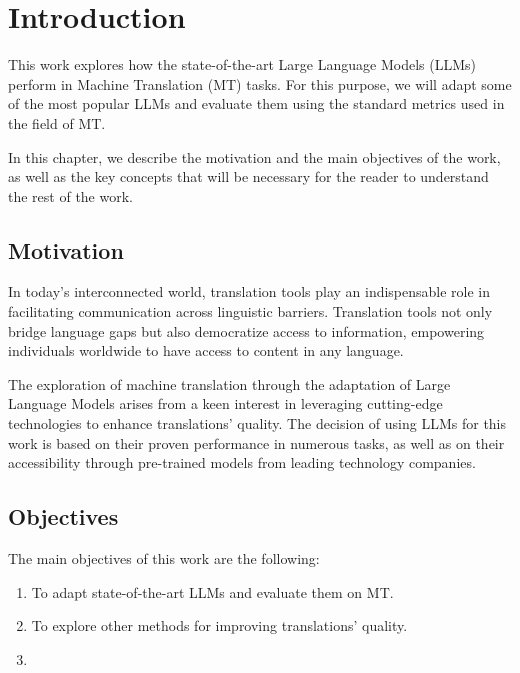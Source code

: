 \documentclass[11pt,english,listoffigures,listoftables]{tfgetsinf}
\begin{document}

\chapter{Introduction}

This work explores how the state-of-the-art Large Language Models (LLMs) perform in Machine Translation (MT) tasks. For this purpose, we will adapt some of the most popular LLMs and evaluate them using the standard metrics used in the field of MT. 

In this chapter, we describe the motivation and the main objectives of the work, as well as the key concepts that will be necessary for the reader to understand the rest of the work.

\section{Motivation}

In today's interconnected world, translation tools play an indispensable role in facilitating communication across linguistic barriers. Translation tools not only bridge language gaps but also democratize access to information, empowering individuals worldwide to have access to content in any language.

The exploration of machine translation through the adaptation of Large Language Models arises from a keen interest in leveraging cutting-edge technologies to enhance translations' quality. The decision of using LLMs for this work is based on their proven performance in numerous tasks, as well as on their accessibility through pre-trained models from leading technology companies.

\section{Objectives}

The main objectives of this work are the following:

\begin{enumerate}
    \item To adapt state-of-the-art LLMs and evaluate them on MT.
    \item To explore other methods for improving translations' quality.
    \item 
\end{enumerate}
\end{document}
